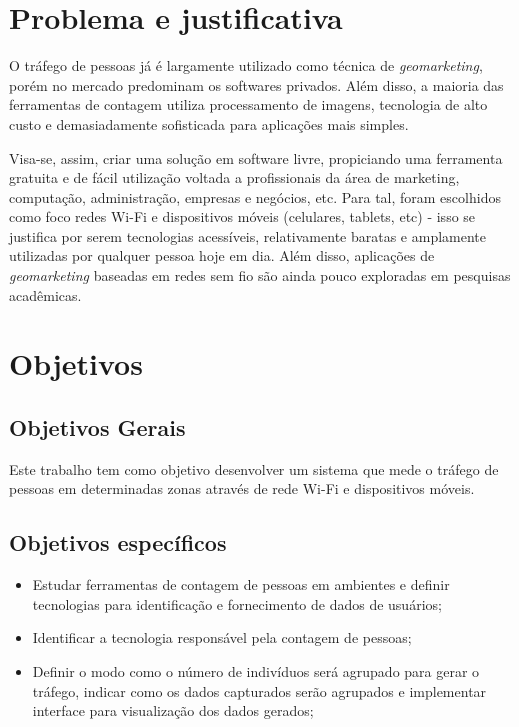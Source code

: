 \section{Problema e justificativa}
O tráfego de pessoas já é largamente utilizado como técnica de \emph{geomarketing}, porém
no mercado predominam os softwares privados. Além disso, a maioria das ferramentas de contagem utiliza processamento de imagens, tecnologia de alto custo e demasiadamente sofisticada para aplicações mais simples. 

Visa-se, assim, criar uma solução em software livre, propiciando uma ferramenta gratuita e de fácil utilização voltada a profissionais da área de marketing, computação, administração, empresas e negócios, etc. Para tal, foram escolhidos como foco redes Wi-Fi e dispositivos móveis (celulares, tablets, etc) - isso se justifica por serem tecnologias acessíveis, relativamente baratas e amplamente utilizadas por qualquer pessoa hoje em dia. Além disso, aplicações de \emph{geomarketing} baseadas em redes sem fio são ainda pouco exploradas em pesquisas acadêmicas.

\section{Objetivos}
\label{objetivos}

\subsection{Objetivos Gerais}
Este trabalho tem como objetivo desenvolver um sistema que mede o tráfego de
pessoas em determinadas zonas através de rede Wi-Fi e dispositivos móveis.

\subsection{Objetivos específicos}
\begin{itemize}
  \item Estudar ferramentas de contagem de pessoas em ambientes e definir tecnologias para identificação e fornecimento de dados de usuários;
  \item Identificar a tecnologia responsável pela contagem de pessoas;
  \item Definir o modo como o número de indivíduos será agrupado para gerar o tráfego, indicar como os dados capturados serão agrupados e implementar interface para visualização dos dados gerados;
\end{itemize}


